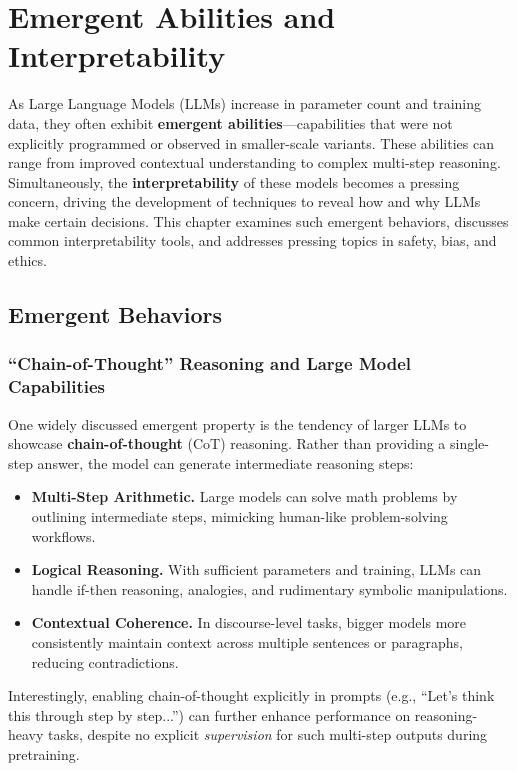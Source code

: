 \chapter{Emergent Abilities and Interpretability}
\label{chap:emergent_interpretability}

\noindent
As Large Language Models (LLMs) increase in parameter count and training data, they often exhibit \textbf{emergent abilities}—capabilities that were not explicitly programmed or observed in smaller-scale variants. These abilities can range from improved contextual understanding to complex multi-step reasoning. Simultaneously, the \textbf{interpretability} of these models becomes a pressing concern, driving the development of techniques to reveal how and why LLMs make certain decisions. This chapter examines such emergent behaviors, discusses common interpretability tools, and addresses pressing topics in safety, bias, and ethics.

\section{Emergent Behaviors}
\label{sec:emergent_behaviors}

\subsection{“Chain-of-Thought” Reasoning and Large Model Capabilities}
\noindent
One widely discussed emergent property is the tendency of larger LLMs to showcase \textbf{chain-of-thought} (CoT) reasoning. Rather than providing a single-step answer, the model can generate intermediate reasoning steps:
\begin{itemize}
    \item \textbf{Multi-Step Arithmetic.} Large models can solve math problems by outlining intermediate steps, mimicking human-like problem-solving workflows.
    \item \textbf{Logical Reasoning.} With sufficient parameters and training, LLMs can handle if-then reasoning, analogies, and rudimentary symbolic manipulations.
    \item \textbf{Contextual Coherence.} In discourse-level tasks, bigger models more consistently maintain context across multiple sentences or paragraphs, reducing contradictions.
\end{itemize}
Interestingly, enabling chain-of-thought explicitly in prompts (e.g., “Let’s think this through step by step...”) can further enhance performance on reasoning-heavy tasks, despite no explicit \emph{supervision} for such multi-step outputs during pretraining.


